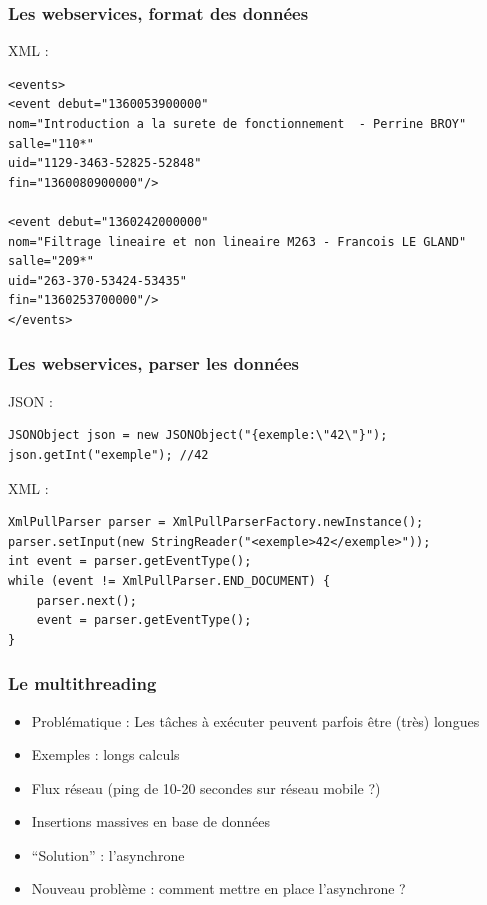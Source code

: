 \documentclass{beamer}
\begin{document}
\begin{frame}[fragile]
\frametitle{Les webservices, format des données}
XML :
\begin{lstlisting}
<events>
<event debut="1360053900000" 
nom="Introduction a la surete de fonctionnement  - Perrine BROY"
salle="110*" 
uid="1129-3463-52825-52848" 
fin="1360080900000"/>

<event debut="1360242000000" 
nom="Filtrage lineaire et non lineaire M263 - Francois LE GLAND"
salle="209*" 
uid="263-370-53424-53435" 
fin="1360253700000"/>
</events>
\end{lstlisting}
\end{frame}
\begin{frame}[fragile]
\frametitle{Les webservices, parser les données}
JSON :
\begin{lstlisting}
JSONObject json = new JSONObject("{exemple:\"42\"}");
json.getInt("exemple"); //42
\end{lstlisting}
XML :
\begin{lstlisting}
XmlPullParser parser = XmlPullParserFactory.newInstance();
parser.setInput(new StringReader("<exemple>42</exemple>"));
int event = parser.getEventType();
while (event != XmlPullParser.END_DOCUMENT) {
    parser.next();
    event = parser.getEventType();
}
\end{lstlisting}
\end{frame}
\begin{frame}[fragile] 
\frametitle{Le multithreading}
\begin{itemize}
  \item Problématique : Les tâches à exécuter peuvent parfois être (très)
  longues
  \item Exemples : longs calculs
  \item Flux réseau (ping de 10-20 secondes sur réseau mobile ?)
  \item Insertions massives en base de données
  \item ``Solution'' : l'asynchrone
  \item Nouveau problème : comment mettre en place l'asynchrone ?
\end{itemize}
\end{frame}
\end{document}
